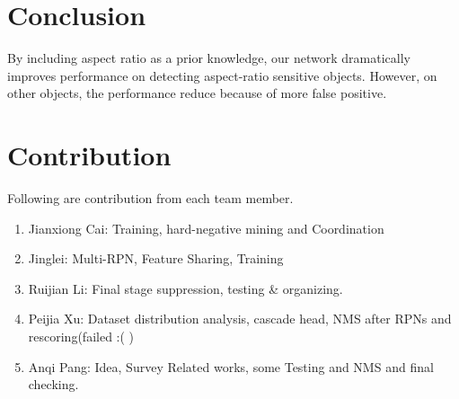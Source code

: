 \documentclass[10pt,twocolumn,letterpaper]{article}
\begin{document}
\section{Conclusion}
By including aspect ratio as a prior knowledge, our network dramatically improves performance on detecting aspect-ratio sensitive objects. However, on other objects, the performance reduce because of more false positive.

\section{Contribution}
Following are contribution from each team member.
\begin{enumerate}
\item Jianxiong Cai: Training, hard-negative mining and Coordination
\item Jinglei: Multi-RPN, Feature Sharing, Training
\item Ruijian Li: Final stage suppression, testing \& organizing.
\item Peijia Xu: Dataset distribution analysis, cascade head, NMS after RPNs and rescoring(failed :( )
\item Anqi Pang: Idea, Survey Related works, some Testing and NMS and final checking.
\end{enumerate}
\end{document}
